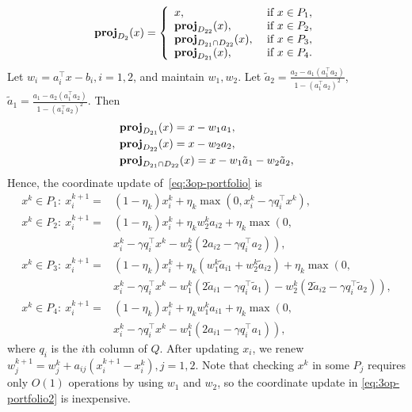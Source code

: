 $$\prj_{D_2}(x)=\left\{
\begin{array}{ll}
x, & \text{ if }x\in P_1,\\
\prj_{D_{22}}(x), &\text{ if }x\in P_2,\\
\prj_{D_{21}\cap D_{22}}(x), & \text{ if }x\in P_3,\\
\prj_{D_{21}}(x), & \text{ if }x\in P_4.
\end{array}
\right.$$ 
Let $w_i=a_i^\top x-b_i, i=1,2$, and maintain $w_1,w_2$. Let $\tilde{a}_2=\frac{a_2-a_1(a_1^\top a_2)}{1-(a_1^\top a_2)^2}$, $\tilde{a}_1=\frac{a_1-a_2(a_1^\top a_2)}{1-(a_1^\top a_2)^2}$. Then 
\begin{align*}
&\prj_{D_{21}}(x)=x-w_1a_1,\\
&\prj_{D_{22}}(x)=x-w_2a_2,\\
&\prj_{D_{21}\cap D_{22}}(x)=x-w_1 \tilde{a}_1-w_2\tilde{a}_2,
\end{align*}
%
%
Hence, the coordinate update of~\eqref{eq:3op-portfolio} is
\begin{subequations}\label{eq:3op-portfolio2}
\begin{align}
x^k\in P_1:\ x_i^{k+1}= & \textstyle (1-\eta_k)x_i^k+\eta_k\max(0, x_i^k-\gamma q_i^\top x^k),\\
x^k\in P_2:\  x_i^{k+1}= & \textstyle (1-\eta_k)x_i^k+\eta_kw_2^ka_{i2}+\eta_k\max\left(0, \right.\nonumber\\
&\textstyle \left.x_i^k-\gamma q_i^\top x^k-w_2^k(2a_{i2}-\gamma q_i^\top a_2)\right),\\
x^k\in P_3:\ x_i^{k+1}= &\textstyle  (1-\eta_k)x_i^k+\eta_k\left(w_1^k \tilde{a}_{i1}+w_2^k\tilde{a}_{i2}\right)+\eta_k\max\left(0,\right.\nonumber\\
&\textstyle \left.x_i^k-\gamma q_i^\top x^k-w_1^k (2\tilde{a}_{i1}-\gamma q_i^\top \tilde{a}_1)-{w}_2^k(2\tilde{a}_{i2}-\gamma q_i^\top \tilde{a}_2)\right),\\
x^k\in P_4:\ x_i^{k+1}= &\textstyle  (1-\eta_k)x_i^k+\eta_k w_1^ka_{i1}+\eta_k\max\left(0, \right.\nonumber\\
&\textstyle \left.x_i^k-\gamma q_i^\top x^k-w_1^k(2a_{i1}-\gamma q_i^\top a_1)\right),
\end{align}
\end{subequations}
where $q_i$ is the $i$th column of $Q$. After updating $x_i$, we renew $w_j^{k+1}=w_j^k+a_{ij}(x_i^{k+1}-x_i^k), j=1,2$. Note that checking $x^k$ in some $P_j$ requires only $O(1)$ operations by using $w_1$ and $w_2$, so the coordinate update in \eqref{eq:3op-portfolio2} is inexpensive.

 
 
